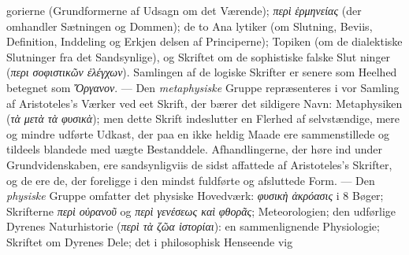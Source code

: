 \documentclass[12pt,a4paper]{book}
\newcommand{\gk}[1]{\textit{#1}}
\begin{document}
gorierne (Grundformerne af Udsagn om det Værende); \gk{περὶ}
\gk{ἑρμηνείας} (der omhandler Sætningen og Dommen); de to Ana\-%
lytiker (om Slutning, Beviis, Definition, Inddeling og Erkjen\-%
delsen af Principerne); Topiken (om de dialektiske Slutninger
fra det Sandsynlige), og Skriftet om de sophistiske falske Slut\-%
ninger (\gk{περι σοφιστικῶν ἐλέγχων}). Samlingen af de logiske
Skrifter er senere som Heelhed betegnet som \gk{Ὄργανον}. ---
Den \emph{metaphysiske} Gruppe repræsenteres i vor Samling af
Aristoteles's Værker ved eet Skrift, der bærer det sildigere
Navn: Metaphysiken (\gk{τὰ μετὰ τὰ φυσικὰ}); men dette Skrift
indeslutter en Flerhed af selvstændige, mere og mindre udførte
Udkast, der paa en ikke heldig Maade ere sammenstillede og
tildeels blandede med uægte Bestanddele. Afhandlingerne, der
høre ind under Grundvidenskaben, ere sandsynligviis de sidst
affattede af Aristoteles's Skrifter, og de ere de, der foreligge i
den mindst fuldførte og afsluttede Form. --- Den \emph{physiske}
Gruppe omfatter det physiske Hovedværk: \gk{φυσικὴ ἀκρόασις} i
8 Bøger; Skrifterne \gk{περὶ οὐρανοῦ} og \gk{περὶ γενέσεως καὶ}
\gk{φθορᾶς}; Meteorologien; den udførlige Dyrenes Naturhistorie
(\gk{περὶ τὰ ζῶα ἱστορίαι}): en sammenlignende Physiologie;
Skriftet om Dyrenes Dele; det i philosophisk Henseende vig\-%
\end{document}
